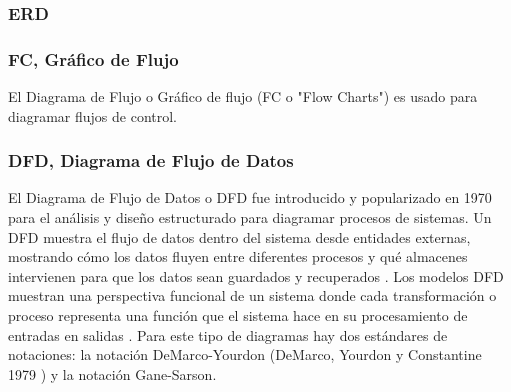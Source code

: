\subsubsection{ERD}

\subsubsection{FC, Gráfico de Flujo}

El Diagrama de Flujo o Gráfico de flujo (FC o "Flow Charts") es usado para diagramar flujos de control.

\subsubsection{DFD, Diagrama de Flujo de Datos}

El Diagrama de Flujo de Datos o DFD fue introducido y popularizado en 1970 para el análisis y diseño estructurado \cite{Gane-Sarson-1979} para diagramar procesos de sistemas. Un DFD muestra el flujo de datos dentro del sistema desde entidades externas, mostrando cómo los datos fluyen entre diferentes procesos y qué almacenes intervienen para que los datos sean guardados y recuperados \cite{Scott-Ambler-2004}. Los modelos DFD muestran una perspectiva funcional de un sistema donde cada transformación o proceso representa una función que el sistema hace en su procesamiento de entradas en salidas \cite{Sommerville-2006}.\newline
Para este tipo de diagramas hay dos estándares de notaciones: la notación DeMarco-Yourdon (DeMarco, Yourdon y Constantine 1979 \cite{Dixit-2007}) y la notación Gane-Sarson.\newline
\newline

